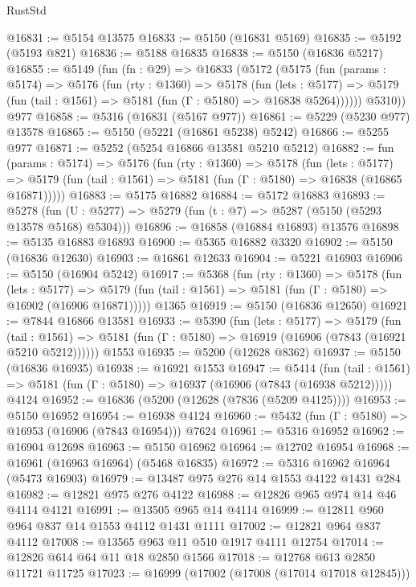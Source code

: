 \begin{lexlean}{RustStd}
\begin{coremodule}
@16831 := @5154 @13575
@16833 := @5150 (@16831 @5169)
@16835 := @5192 (@5193 @821)
@16836 := @5188 @16835
@16838 := @5150 (@16836 @5217)
@16855 := @5149
    (fun (fn : @29) =>
    @16833
      (@5172
        (@5175
          (fun (params : @5174) =>
          @5176
            (fun (rty : @1360) =>
            @5178
              (fun (lets : @5177) =>
              @5179 (fun (tail : @1561) => @5181 (fun (Γ : @5180) => @16838 @5264))))))
        @5310))
    @977
@16858 := @5316 (@16831 (@5167 @977))
@16861 := @5229 (@5230 @977) @13578
@16865 := @5150 (@5221 (@16861 @5238) @5242)
@16866 := @5255 @977
@16871 := @5252 (@5254 @16866 @13581 @5210 @5212)
@16882 := fun (params : @5174) =>
  @5176
    (fun (rty : @1360) =>
    @5178
      (fun (lets : @5177) =>
      @5179 (fun (tail : @1561) => @5181 (fun (Γ : @5180) => @16838 (@16865 @16871)))))
@16883 := @5175 @16882
@16884 := @5172 @16883
@16893 := @5278
    (fun (U : @5277) => @5279 (fun (t : @7) => @5287 (@5150 (@5293 @13578 @5168) @5304)))
@16896 := @16858 (@16884 @16893) @13576
@16898 := @5135 @16883 @16893
@16900 := @5365 @16882 @3320
@16902 := @5150 (@16836 @12630)
@16903 := @16861 @12633
@16904 := @5221 @16903
@16906 := @5150 (@16904 @5242)
@16917 := @5368
    (fun (rty : @1360) =>
    @5178
      (fun (lets : @5177) =>
      @5179 (fun (tail : @1561) => @5181 (fun (Γ : @5180) => @16902 (@16906 @16871)))))
    @1365
@16919 := @5150 (@16836 @12650)
@16921 := @7844 @16866 @13581
@16933 := @5390
    (fun (lets : @5177) =>
    @5179
      (fun (tail : @1561) =>
      @5181 (fun (Γ : @5180) => @16919 (@16906 (@7843 (@16921 @5210 @5212))))))
    @1553
@16935 := @5200 (@12628 @8362)
@16937 := @5150 (@16836 @16935)
@16938 := @16921 @1553
@16947 := @5414
    (fun (tail : @1561) => @5181 (fun (Γ : @5180) => @16937 (@16906 (@7843 (@16938 @5212)))))
    @4124
@16952 := @16836 (@5200 (@12628 (@7836 (@5209 @4125))))
@16953 := @5150 @16952
@16954 := @16938 @4124
@16960 := @5432 (fun (Γ : @5180) => @16953 (@16906 (@7843 @16954))) @7624
@16961 := @5316 @16952
@16962 := @16904 @12698
@16963 := @5150 @16962
@16964 := @12702 @16954
@16968 := @16961 (@16963 @16964) (@5468 @16835)
@16972 := @5316 @16962 @16964 (@5473 @16903)
@16979 := @13487 @975 @276 @14 @1553 @4122 @1431 @284
@16982 := @12821 @975 @276 @4122
@16988 := @12826 @965 @974 @14 @46 @4114 @4121
@16991 := @13505 @965 @14 @4114
@16999 := @12811 @960 @964 @837 @14 @1553 @4112 @1431 @1111
@17002 := @12821 @964 @837 @4112
@17008 := @13565 @963 @11 @510 @1917 @4111 @12754
@17014 := @12826 @614 @64 @11 @18 @2850 @1566
@17018 := @12768 @613 @2850 @11721 @11725
@17023 := @16999 (@17002 (@17008 (@17014 @17018 @12845)))

\end{coremodule}
\end{lexlean}
